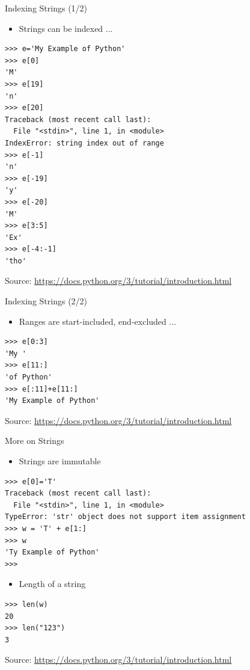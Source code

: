 \documentclass{beamer}
\begin{document}
\begin{frame}[fragile]
{\centerline{Indexing Strings (1/2)}}
\begin{itemize}
    \item Strings can be indexed  ...
\end{itemize} 
\begin{lstlisting}[style=myPythonStyle]
>>> e='My Example of Python'
>>> e[0]
'M'
>>> e[19]
'n'
>>> e[20]
Traceback (most recent call last):
  File "<stdin>", line 1, in <module>
IndexError: string index out of range
>>> e[-1]
'n'
>>> e[-19]
'y'
>>> e[-20]
'M'
>>> e[3:5]
'Ex'
>>> e[-4:-1]
'tho'
\end{lstlisting}
\begin{center}
\tiny Source: \url{https://docs.python.org/3/tutorial/introduction.html}
\end{center}

\end{frame}

\begin{frame}[fragile]
{\centerline{Indexing Strings (2/2)}}
\begin{itemize}
    \item Ranges are start-included, end-excluded  ...
\end{itemize} 
\begin{lstlisting}[style=myPythonStyle]
>>> e[0:3]
'My '
>>> e[11:]
'of Python'
>>> e[:11]+e[11:]
'My Example of Python'

\end{lstlisting}
\begin{center}
\tiny Source: \url{https://docs.python.org/3/tutorial/introduction.html}
\end{center}

\end{frame}


\begin{frame}[fragile]
{\centerline{More on Strings}}
\begin{itemize}
    \item Strings are immutable
\end{itemize} 
\begin{lstlisting}[style=myPythonStyle]
>>> e[0]='T'
Traceback (most recent call last):
  File "<stdin>", line 1, in <module>
TypeError: 'str' object does not support item assignment
>>> w = 'T' + e[1:]
>>> w
'Ty Example of Python'
>>> 

\end{lstlisting}

\begin{itemize}
    \item Length of a string
\end{itemize} 
\begin{lstlisting}[style=myPythonStyle]
>>> len(w)
20
>>> len("123")
3

\end{lstlisting}


\begin{center}
\tiny Source: \url{https://docs.python.org/3/tutorial/introduction.html}
\end{center}

\end{frame}
\end{document}

